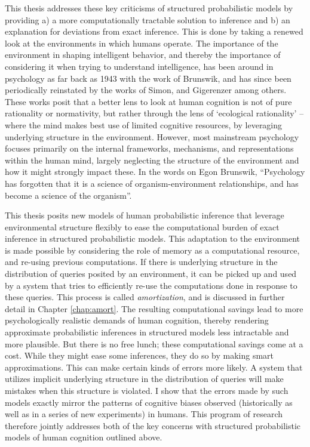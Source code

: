 This thesis addresses these key criticisms of structured probabilistic models by providing a) a more computationally tractable solution to inference and b) an explanation for deviations from exact inference. This is done by taking a renewed look at the environments in which humans operate. The importance of the environment in shaping intelligent behavior, and thereby the importance of considering it when trying to understand intelligence, has been around in psychology as far back as 1943 with the work of Brunswik\cite{brunswik1943organismic}, and has since been periodically reinstated by the works of Simon\cite{simon1956rational}, %
and Gigerenzer \cite{gigerenzer1999simple} among others. These works posit that a better lens to look at human cognition is not of pure rationality or normativity, but rather through the lens of `ecological rationality' -- where the mind makes best use of limited cognitive resources, by leveraging underlying structure in the environment. However, most mainstream psychology focuses primarily on the internal frameworks, mechanisms, and representations within the human mind, largely neglecting the structure of the environment and how it might strongly impact these. In the words on Egon Brunswik, ``Psychology has forgotten that it is a science of organism-environment relationships, and has become a science of the organism''.  

This thesis posits new models of human probabilistic inference that leverage environmental structure flexibly to ease the computational burden of exact inference in structured probabilistic models. This adaptation to the environment is made possible by considering the role of memory as a computational resource, and re-using previous computations. If there is underlying structure in the distribution of queries posited by an environment, it can be picked up and used by a system that tries to efficiently re-use the computations done in response to these queries. This process is called \textit{amortization}, and is discussed in further detail in Chapter \ref{chap:amort}. %
The resulting computational savings lead to more psychologically realistic demands of human cognition, thereby rendering approximate probabilistic inferences in structured models less intractable and more plausible. But there is no free lunch; these computational savings come at a cost. While they might ease some inferences, they do so by making smart approximations. This can make certain kinds of errors more likely. A system that utilizes implicit underlying structure in the distribution of queries will make mistakes when this structure is violated. I show that the errors made by such models exactly mirror the patterns of cognitive biases observed (historically as well as in a series of new experiments) in humans. This program of research therefore jointly addresses both of the key concerns with structured probabilistic models of human cognition outlined above.

